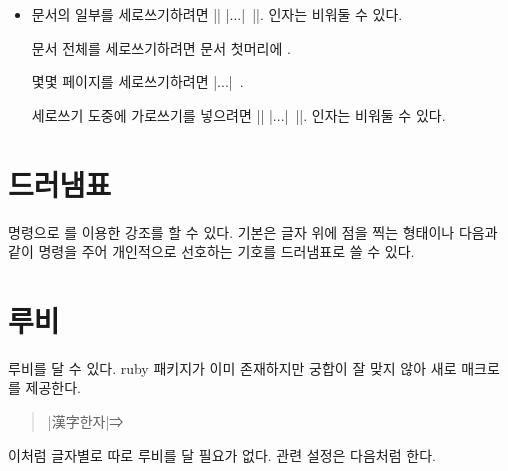 \documentclass[a4paper]{article}
\def\logoko{\actualtag{ko, phoneme=[ˌkeɪˈəʊ]}{\textsf{k}\kern-.04em $o$}}
\def\luatex{\actualtag{LuaTeX}{\hologo{LuaTeX}}}
\def\luatexko{\luatex-\logoko}
\def\ldots{|...|}
\newenvironment{plaintex}{%
  \begin{itemize}\linespread{1.2}\small
    \itemsep0pt plus1pt minus1pt
    \topsep=\itemsep
    \item[\color{gray}plain \TeX]
}{
  \end{itemize}%
}
\def\textdblrightarrow{\quad ⇒\quad}
\begin{document}
\begin{plaintex}
  문서의 일부를 세로쓰기하려면 || \ldots\ |\endvertical|.
  인자는 비워둘 수 있다.

  문서 전체를 세로쓰기하려면 문서 첫머리에 .

  몇몇 페이지를 세로쓰기하려면  \ldots\ .

  세로쓰기 도중에 가로쓰기를 넣으려면 || \ldots\ |\endhorizontal|.
  인자는 비워둘 수 있다.
\end{plaintex}

\section{드러냄표}\label{sec:dotemph}

\pkgkwd{\dotemph} 명령으로 %
를 이용한 강조를 할 수 있다.  기본은 글자 위에 점을 찍는 형태이나
다음과 같이 명령을 주어 개인적으로 선호하는 기호를 드러냄표로 쓸 수
있다.


\section{루비}\label{sec:ruby}

루비를 달 수 있다. ruby 패키지가 이미 존재하지만  궁합이 잘
맞지 않아 새로 매크로를 제공한다.%
\pkgkwd*{\ruby}
\begin{quote}
  |{漢字}{한자}|\textdblrightarrow{}
\end{quote}
이처럼 글자별로 따로 루비를 달 필요가 없다.  관련 설정은 다음처럼
한다.
\end{document}
